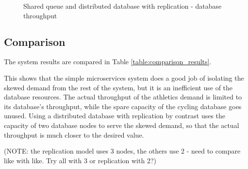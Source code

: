 \begin{figure}
	\caption{Shared queue and distributed database with replication - database throughput}
	\label{figure:queueddwr_database}
	\centering
\end{figure}

%
%
\FloatBarrier
\subsection{Comparison}

\begin{shaded}
The system results are compared in Table \ref{table:comparison_results}.

This shows that the simple microservices system does a good job of isolating the skewed demand from the rest of the system, but it is an inefficient use of the database resources.  The actual throughput of the athletics demand is limited to its database's throughput, while the spare capacity of the cycling database goes unused.  Using a distributed database with replication by contrast uses the capacity of two database nodes to serve the skewed demand, so that the actual throughput is much closer to the desired value.

(NOTE: the replication model uses 3 nodes, the others use 2 - need to compare like with like.  Try all with 3 or replication with 2?)
\end{shaded}

